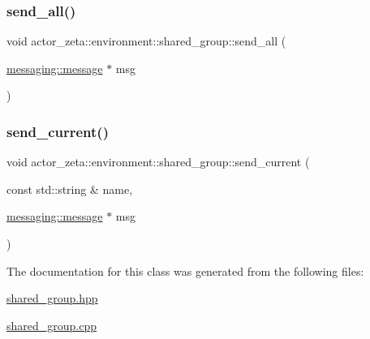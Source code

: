 \mbox{\label{classactor__zeta_1_1environment_1_1shared__group_ab74c04703451bceb0c517ca5fd4d8e05}} 
\subsubsection{\texorpdfstring{send\+\_\+all()}{send\_all()}}
{\footnotesize\ttfamily void actor\+\_\+zeta\+::environment\+::shared\+\_\+group\+::send\+\_\+all (\begin{DoxyParamCaption}\item[{\hyperlink{classactor__zeta_1_1messaging_1_1message}{messaging\+::message} $\ast$}]{msg }\end{DoxyParamCaption})}

\mbox{\label{classactor__zeta_1_1environment_1_1shared__group_a92fa230ff67cd97226ba57efb43472e2}} 
\subsubsection{\texorpdfstring{send\+\_\+current()}{send\_current()}}
{\footnotesize\ttfamily void actor\+\_\+zeta\+::environment\+::shared\+\_\+group\+::send\+\_\+current (\begin{DoxyParamCaption}\item[{const std\+::string \&}]{name,  }\item[{\hyperlink{classactor__zeta_1_1messaging_1_1message}{messaging\+::message} $\ast$}]{msg }\end{DoxyParamCaption})}



The documentation for this class was generated from the following files\+:\begin{DoxyCompactItemize}
\item 
\hyperlink{shared__group_8hpp}{shared\+\_\+group.\+hpp}\item 
\hyperlink{shared__group_8cpp}{shared\+\_\+group.\+cpp}\end{DoxyCompactItemize}
